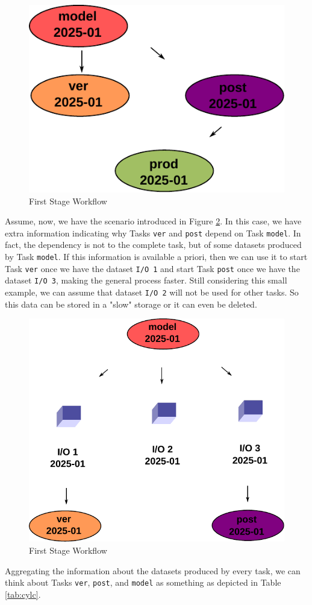 \documentclass[a4paper]{article}
\begin{document}
\begin{figure}[H]
  \centering
  \includegraphics[width=0.4\columnwidth]{cylc-1}
  \caption{First Stage Workflow}
  \label{fig:cylc-1}
\end{figure}

Assume, now, we have the scenario introduced in Figure \ref{fig:cylc-io-model-2}. In this case, we have extra information indicating why Tasks \texttt{ver} and \texttt{post} depend on Task \texttt{model}. In fact, the dependency is not to the complete task, but of some datasets produced by Task \texttt{model}. If this information is available a priori, then we can use it to start Task \texttt{ver} once we have the dataset \texttt{I/O 1} and start Task \texttt{post} once we have the dataset \texttt{I/O 3}, making the general process faster. Still considering this small example, we can assume that dataset \texttt{I/O 2} will not be used for other tasks. So this data can be stored in a "slow" storage or it can even be deleted.

\begin{figure}[H]
  \centering
  \includegraphics[width=0.6\columnwidth]{cylc-io-model-2}
  \caption{First Stage Workflow}
  \label{fig:cylc-io-model-2}
\end{figure}

Aggregating the information about the datasets produced by every task, we can think about Tasks \texttt{ver}, \texttt{post}, and \texttt{model} as something as depicted in Table \ref{tab:cylc}.
\end{document}
